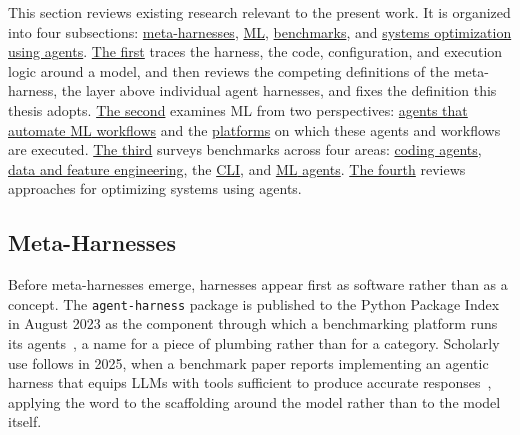 \documentclass[
english,                 %
bibtex,                  %
]{kththesis}
\numberwithin{listing}{chapter}
\begin{document}
This section reviews existing research relevant to the present work. It is organized into four subsections: \hyperref[sec:bg_meta_harnesses]{meta-harnesses}, \hyperref[sec:bg_machine_learning]{\gls{ML}}, \hyperref[sec:bg_benchmarks]{benchmarks}, and \hyperref[sec:bg_systems_optimization_using_agents]{systems optimization using agents}. \hyperref[sec:bg_meta_harnesses]{The first} traces the harness, the code, configuration, and execution logic around a model, and then reviews the competing definitions of the meta-harness, the layer above individual agent harnesses, and fixes the definition this thesis adopts. \hyperref[sec:bg_machine_learning]{The second} examines \gls{ML} from two perspectives: \hyperref[sec:bg_agents_2]{agents that automate \gls{ML} workflows} and the \hyperref[sec:bg_platforms]{platforms} on which these agents and workflows are executed. \hyperref[sec:bg_benchmarks]{The third} surveys benchmarks across four areas: \hyperref[sec:bg_coding_agents_2]{coding agents}, \hyperref[sec:bg_data_and_feature_engineering]{data and feature engineering}, the \hyperref[sec:rw_cli]{\gls{CLI}}, and \hyperref[sec:bg_machine_learning_agents]{\gls{ML} agents}. \hyperref[sec:bg_systems_optimization_using_agents]{The fourth} reviews approaches for optimizing systems using agents.

\subsection{Meta-Harnesses}
\label{sec:bg_meta_harnesses}
\glsresetall

Before meta-harnesses emerge, harnesses appear first as software rather than as a concept. The \texttt{agent-harness} package is published to the Python Package Index in August 2023 as the component through which a benchmarking platform runs its agents~\cite{schonholtz_agent-harness_2023}, a name for a piece of plumbing rather than for a category. Scholarly use follows in 2025, when a benchmark paper reports implementing an agentic harness that equips \glspl{LLM} with tools sufficient to produce accurate responses~\cite{bigeard_finance_2025}, applying the word to the scaffolding around the model rather than to the model itself.
\end{document}
